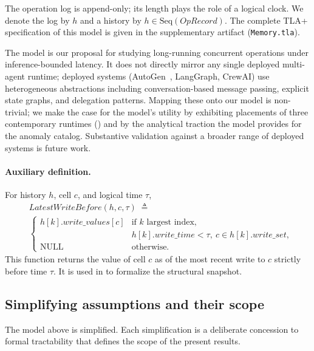 \documentclass[journal,compsoc,10pt]{IEEEtran}
\providecommand{\citep}{\cite}
\theoremstyle{definition}
\theoremstyle{remark}
\newcommand{\fld}[1]{\mathit{#1}}
\newcommand{\ws}{\fld{write\_set}}
\newcommand{\wt}{\fld{write\_time}}
\newcommand{\wv}{\fld{write\_values}}
\begin{document}
\noindent
The operation log is append-only; its length plays the role of a
logical clock. We denote the log by $h$ and a history by $h \in
\mathrm{Seq}(\fld{OpRecord})$. The complete TLA+ specification of this
model is given in the supplementary artifact (\texttt{Memory.tla}).

The model is our proposal for studying long-running concurrent
operations under inference-bounded latency. It does not directly mirror
any single deployed multi-agent runtime; deployed systems
(AutoGen~\citep{WuEtAl2023AutoGen},
LangGraph, CrewAI) use heterogeneous abstractions including
conversation-based message passing, explicit state graphs, and
delegation patterns. Mapping these onto our model is non-trivial; we
make the case for the model's utility by exhibiting placements of
three contemporary runtimes () and by the
analytical traction the model provides for the anomaly catalog.
Substantive validation against a broader range of deployed systems is
future work.

\paragraph{Auxiliary definition.} For history $h$, cell $c$, and
logical time $\tau$,
\[
  \begin{aligned}
  &\fld{LatestWriteBefore}(h, c, \tau) \;\triangleq\;\\
  &\begin{cases}
    h[k].\wv[c] & \text{if } k \text{ largest index},\\
                & h[k].\wt < \tau,\ c \in h[k].\ws,\\
    \mathrm{NULL} & \text{otherwise.}
  \end{cases}
  \end{aligned}
\]
This function returns the value of cell $c$ as of the most recent
write to $c$ strictly before time $\tau$. It is used in
 to formalize the structural snapshot.

\subsection{Simplifying assumptions and their scope}
\label{sec:assumptions}
The model above is simplified. Each simplification is a
deliberate concession to formal tractability that defines the scope
of the present results.
\end{document}
